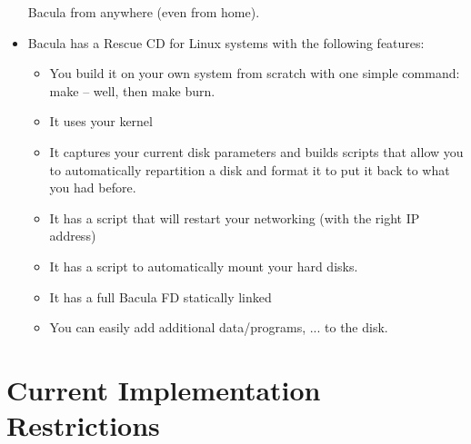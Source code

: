 \begin{itemize}
   Bacula from anywhere (even from home).
\item Bacula has a Rescue CD for Linux systems with the following features:  
   \begin{itemize}
   \item You build it on your own system from scratch with one simple  command:
      make -- well, then make burn. 
   \item It uses your kernel  
   \item It captures your current disk parameters and builds scripts that  allow
      you to automatically repartition a disk and format it to  put it back to what
      you had before. 
   \item It has a script that will restart your networking (with the right  IP
      address)  
   \item It has a script to automatically mount your hard disks.  
   \item It has a full Bacula FD statically linked  
   \item You can easily add additional data/programs, ... to the disk.  
   \end{itemize}

\end{itemize}

\section{Current Implementation Restrictions}

